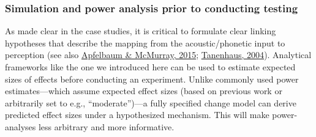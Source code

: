 \documentclass[
  11pt,
  english,
  man,floatsintext]{apa6}
\begin{document}
\hypertarget{simulation-and-power-analysis-prior-to-conducting-testing}{%
\subsubsection{Simulation and power analysis prior to conducting testing}\label{simulation-and-power-analysis-prior-to-conducting-testing}}

As made clear in the case studies, it is critical to formulate clear linking hypotheses that describe the mapping from the acoustic/phonetic input to perception (see also \protect\hyperlink{ref-apfelbaum-mcmurray2015}{Apfelbaum \& McMurray, 2015}; \protect\hyperlink{ref-tanenhaus2004}{Tanenhaus, 2004}). Analytical frameworks like the one we introduced here can be used to estimate expected sizes of effects before conducting an experiment. Unlike commonly used power estimates---which assume expected effect sizes (based on previous work or arbitrarily set to e.g., ``moderate'')---a fully specified change model can derive predicted effect sizes under a hypothesized mechanism. This will make power-analyses less arbitrary and more informative.
\end{document}
